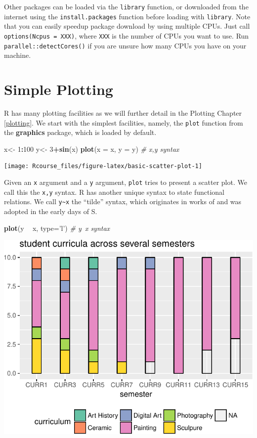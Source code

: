 \documentclass[]{book}
\newenvironment{Shaded}{\begin{snugshade}}{\end{snugshade}}
\newcommand{\CommentTok}[1]{\textcolor[rgb]{0.56,0.35,0.01}{\textit{#1}}}
\newcommand{\DataTypeTok}[1]{\textcolor[rgb]{0.13,0.29,0.53}{#1}}
\newcommand{\DecValTok}[1]{\textcolor[rgb]{0.00,0.00,0.81}{#1}}
\newcommand{\KeywordTok}[1]{\textcolor[rgb]{0.13,0.29,0.53}{\textbf{#1}}}
\newcommand{\NormalTok}[1]{#1}
\newcommand{\OperatorTok}[1]{\textcolor[rgb]{0.81,0.36,0.00}{\textbf{#1}}}
\newcommand{\StringTok}[1]{\textcolor[rgb]{0.31,0.60,0.02}{#1}}
\theoremstyle{definition}
\theoremstyle{definition}
\theoremstyle{definition}
\theoremstyle{remark}
\begin{document}
Other packages can be loaded via the \texttt{library} function, or downloaded from the internet using the \texttt{install.packages} function before loading with \texttt{library}.
Note that you can easily speedup package download by using multiple CPUs.
Just call \texttt{options(Ncpus\ =\ XXX)}, where \texttt{XXX} is the number of CPUs you want to use.
Run \texttt{parallel::detectCores()} if you are unsure how many CPUs you have on your machine.

\hypertarget{simple-plotting}{%
\section{Simple Plotting}\label{simple-plotting}}

R has many plotting facilities as we will further detail in the Plotting Chapter \ref{plotting}.
We start with the simplest facilities, namely, the \texttt{plot} function from the \textbf{graphics} package, which is loaded by default.

\begin{Shaded}
\begin{Highlighting}[]
\NormalTok{x<-}\StringTok{ }\DecValTok{1}\OperatorTok{:}\DecValTok{100}
\NormalTok{y<-}\StringTok{ }\DecValTok{3}\OperatorTok{+}\KeywordTok{sin}\NormalTok{(x) }
\KeywordTok{plot}\NormalTok{(}\DataTypeTok{x =}\NormalTok{ x, }\DataTypeTok{y =}\NormalTok{ y) }\CommentTok{# x,y syntax                         }
\end{Highlighting}
\end{Shaded}

\texttt{[image: Rcourse\_files/figure-latex/basic-scatter-plot-1]}

Given an \texttt{x} argument and a \texttt{y} argument, \texttt{plot} tries to present a scatter plot.
We call this the \texttt{x,y} syntax.
R has another unique syntax to state functional relations.
We call \texttt{y\textasciitilde{}x} the ``tilde'' syntax, which originates in works of \citet{wilkinson1973symbolic} and was adopted in the early days of S.

\begin{Shaded}
\begin{Highlighting}[]
\KeywordTok{plot}\NormalTok{(y }\OperatorTok{~}\StringTok{ }\NormalTok{x, }\DataTypeTok{type=}\StringTok{'l'}\NormalTok{) }\CommentTok{# y~x syntax }
\end{Highlighting}
\end{Shaded}

\includegraphics[width=0.5\linewidth]{Rcourse_files/figure-latex/unnamed-chunk-32-1}
\end{document}
